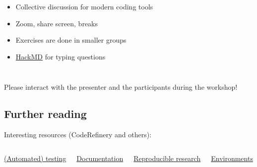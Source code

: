 \documentclass[usenames,dvipsnames]{beamer}
\theoremstyle{plain}
\theoremstyle{definition}
\begin{document}
\begin{frame}{\setframetitle{}}
  \begin{columns}[t]
    \centering
    \begin{itemize}
      \item Collective discussion for modern coding tools \vspace{0.25cm}
      \item Zoom, share screen, breaks \vspace{0.25cm}
      \item Exercises are done in smaller groups \vspace{0.25cm}
      \item \href{https://hackmd.io/dYZPs_f9Q6mW423kzkgwsQ}{\color{gray} HackMD} for typing questions
\end{itemize}
  \end{columns}

  \vspace{2cm}
  Please interact with the presenter and the participants during the workshop!
  \end{frame}




\subsection{Further reading}

\begin{frame}{\setframetitle{}}

Interesting resources (CodeRefinery and others):\vspace{1cm}

  \begin{columns}[t]
    \centering
      \href{https://coderefinery.github.io/testing/}{\color{gray} (Automated) testing}

    \centering
    \href{https://coderefinery.github.io/documentation/}{\color{gray} Documentation}

    \centering
    \href{https://coderefinery.github.io/reproducible-research/}{\color{gray} Reproducible research}

    \centering
     \href{https://towardsdatascience.com/ideal-python-environment-setup-for-data-science-cdb03a447de8}{\color{gray} Environments}

  \end{columns}
  \end{frame}
\end{document}
